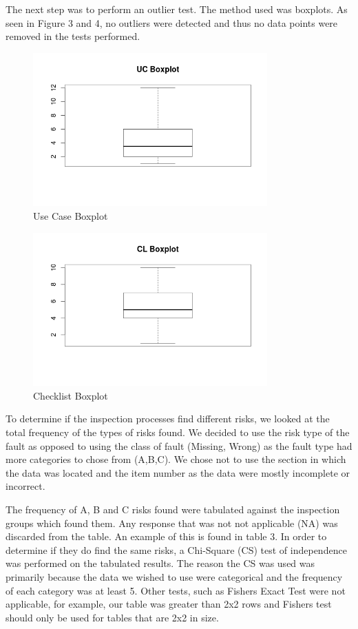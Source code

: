 \documentclass[10pt,twocolumn]{article}
\begin{document}
The next step was to perform an outlier test. The method used was boxplots. As seen in Figure 3 and 4, no outliers were detected and thus no data points were removed in the tests performed. 

\begin{figure}[ht]
\centering
\includegraphics[width=90mm]{uc_box.png}
\caption{Use Case Boxplot}
\end{figure}

\begin{figure}[ht]
\centering
\includegraphics[width=90mm]{cl_box.png}
\caption{Checklist Boxplot}
\end{figure}



To determine if the inspection processes find different risks, we looked at the total frequency of the types of risks found. We decided to use the risk type of the fault as opposed to using the class of fault (Missing, Wrong) as the fault type had more categories to chose from (A,B,C). We chose not to use the section in which the data was located and the item number as the data were mostly incomplete or incorrect.

The frequency of A, B and C risks found were tabulated against the inspection groups which found them. Any response that was not not applicable (NA) was discarded from the table. An example of this is found in table 3. In order to determine if they do find the same risks, a Chi-Square (CS) test of independence was performed on the tabulated results. The reason the CS was used was primarily because the data we wished to use were categorical and the frequency of each category was at least 5. Other tests, such as Fishers Exact Test were not applicable, for example, our table was greater than 2x2 rows and Fishers test should only be used for tables that are 2x2 in size.
\end{document}
